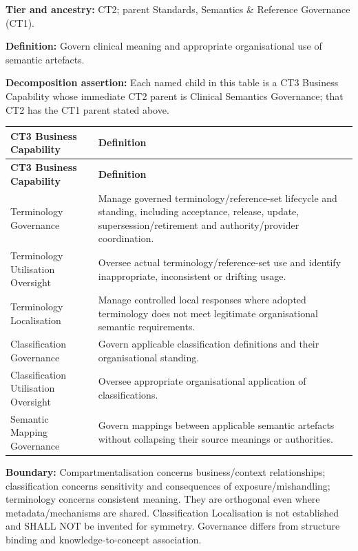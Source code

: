 \textbf{Tier and ancestry:} CT2; parent Standards, Semantics \& Reference Governance (CT1).

\label{rad:business:715}

\textbf{Definition:} Govern clinical meaning and appropriate organisational use of semantic artefacts.

\label{rad:business:717}

\textbf{Decomposition assertion:} Each named child in this table is a CT3 Business Capability whose immediate CT2 parent is Clinical Semantics Governance; that CT2 has the CT1 parent stated above.

\label{rad:business:719}
\begingroup\small\setlength{\TableWidth}{\dimexpr\linewidth-4\tabcolsep-3\arrayrulewidth\relax}
\begin{longtable}{|>{\raggedright\arraybackslash}p{0.35\TableWidth}|>{\raggedright\arraybackslash}p{0.65\TableWidth}|}
\hline\rowcolor{TableHead}\textbf{CT3 Business Capability} & \textbf{Definition}\\\hline\endfirsthead
\hline\rowcolor{TableHead}\textbf{CT3 Business Capability} & \textbf{Definition}\\\hline\endhead
\hline\endfoot
Terminology Governance & Manage governed terminology/\allowbreak{}reference-set lifecycle and standing, including acceptance, release, update, supersession/\allowbreak{}retirement and authority/\allowbreak{}provider coordination.\\\hline
Terminology Utilisation Oversight & Oversee actual terminology/\allowbreak{}reference-set use and identify inappropriate, inconsistent or drifting usage.\\\hline
Terminology Localisation & Manage controlled local responses where adopted terminology does not meet legitimate organisational semantic requirements.\\\hline
Classification Governance & Govern applicable classification definitions and their organisational standing.\\\hline
Classification Utilisation Oversight & Oversee appropriate organisational application of classifications.\\\hline
Semantic Mapping Governance & Govern mappings between applicable semantic artefacts without collapsing their source meanings or authorities.\\\hline
\end{longtable}\endgroup
{}\label{rad:business:728}

\textbf{Boundary:} Compartmentalisation concerns business/\allowbreak{}context relationships; classification concerns sensitivity and consequences of exposure/\allowbreak{}mishandling; terminology concerns consistent meaning. They are orthogonal even where metadata/\allowbreak{}mechanisms are shared. Classification Localisation is not established and SHALL NOT be invented for symmetry. Governance differs from structure binding and knowledge-to-concept association.

